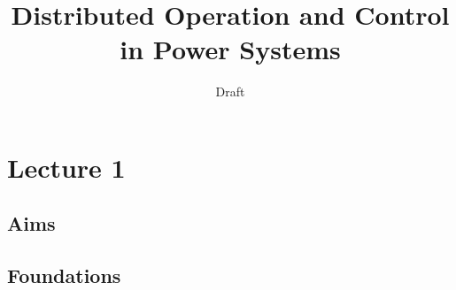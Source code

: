 \documentclass{article}
\title{Distributed Operation and Control in Power Systems}
\author{
  Draft \\
}
\begin{document}
\maketitle

\begin{abstract}


\end{abstract}

\section{Lecture 1}
\subsection{Aims}

\subsection{Foundations}
\end{document}
